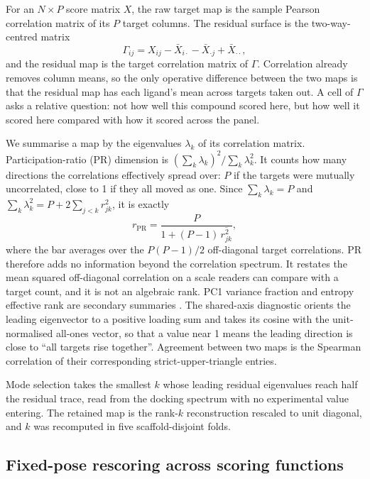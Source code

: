 For an $N\times P$ score matrix $X$, the raw target map is the sample Pearson correlation matrix
of its $P$ target columns. The residual surface is the two-way-centred matrix
\begin{equation}
\Gamma_{ij}=X_{ij}-\bar X_{i\cdot}-\bar X_{\cdot j}+\bar X_{\cdot\cdot},
\label{eq:centering}
\end{equation}
and the residual map is the target correlation matrix of $\Gamma$. Correlation already removes
column means, so the only operative difference between the two maps is that the residual map has
each ligand's mean across targets taken out. A cell of $\Gamma$ asks a relative question: not
how well this compound scored here, but how well it scored here compared with how it scored
across the panel.

We summarise a map by the eigenvalues $\lambda_k$ of its correlation matrix.
Participation-ratio (PR) dimension is $(\sum_k\lambda_k)^2/\sum_k\lambda_k^2$. It counts how
many directions the correlations effectively spread over: $P$ if the targets were mutually
uncorrelated, close to 1 if they all moved as one. Since $\sum_k\lambda_k=P$ and
$\sum_k\lambda_k^2=P+2\sum_{j<k}r_{jk}^2$, it is exactly
\begin{equation}
r_{\mathrm{PR}}=\frac{P}{1+(P-1)\,\overline{r_{jk}^{2}}},
\label{eq:pr}
\end{equation}
where the bar averages over the $P(P-1)/2$ off-diagonal target correlations. PR therefore adds
no information beyond the correlation spectrum. It restates the mean squared off-diagonal
correlation on a scale readers can compare with a target count, and it is not an algebraic
rank. PC1 variance fraction and entropy effective rank are secondary summaries
\cite{roy2007,mazzucato2016}. The shared-axis diagnostic orients the leading eigenvector to a
positive loading sum and takes its cosine with the unit-normalised all-ones vector, so that a
value near 1 means the leading direction is close to ``all targets rise together''. Agreement
between two maps is the Spearman correlation of their corresponding strict-upper-triangle
entries.

Mode selection takes the smallest $k$ whose leading residual eigenvalues reach half the residual
trace, read from the docking spectrum with no experimental value entering. The retained map is
the rank-$k$ reconstruction rescaled to unit diagonal, and $k$ was recomputed in five
scaffold-disjoint folds.

\subsection{Fixed-pose rescoring across scoring functions}

